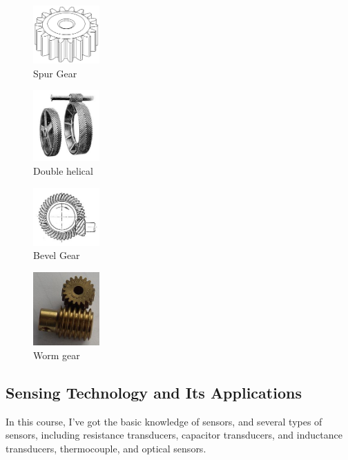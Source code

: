 \begin{figure}
  \centering
  \includegraphics[width=1in]{fig/220px-Spur_Gear_12mm,_18t.svg.png}
  \caption{Spur Gear}\label{fig_spur}
\end{figure}
\begin{figure}
  \centering
  \includegraphics[width=1in]{fig/220px-Herringbone_gears_(Bentley,_Sketches_of_Engine_and_Machine_Details).jpg}
  \caption{Double helical}\label{fig_helical}
\end{figure}
\begin{figure}
  \centering
  \includegraphics[width=1in]{fig/File-Sprocket35b.jpg}
  \caption{Bevel Gear}\label{fig_bevel}
\end{figure}
\begin{figure}
  \centering
  \includegraphics[width=1in]{fig/220px-Worm_Gear_and_Pinion.jpg}
  \caption{Worm gear}\label{fig_worm}
\end{figure}


\subsection{Sensing Technology and Its Applications}
In this course, I've got the basic knowledge of sensors, and several types of sensors, including resistance transducers, capacitor transducers, and inductance transducers, thermocouple, and optical sensors.

